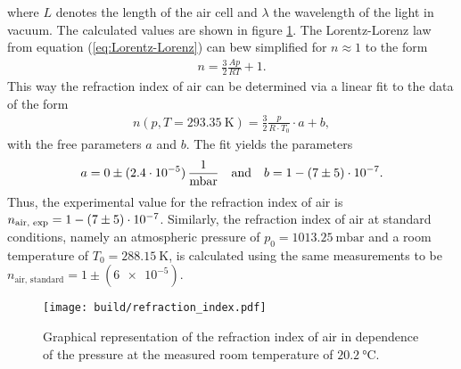 where $L$ denotes the length of the air cell and $\lambda$ the wavelength of the light in vacuum.
The calculated values are shown in figure \ref{fig:refraction_index}.
The Lorentz-Lorenz law from equation (\ref{eq:Lorentz-Lorenz}) can bew simplified for $n\approx1$ to the form
\begin{align}
    n = \frac 32 \frac{Ap}{RT}+1.
\end{align}
This way the refraction index of air can be determined via a linear fit to the data of the form
\begin{align}
    n(p, T=\SI{293.35}{\kelvin}) = \frac 32 \frac{p}{R\cdot T_0}\cdot a + b,
\end{align}
with the free parameters $a$ and $b$.
The fit yields the parameters
\begin{align*}
    a = 0\pm (2.4\cdot 10^{-5})\, \frac1{\text{mbar}} \quad \text{and} \quad b = 1 - \num{7\pm5e-7}.
\end{align*}
Thus, the experimental value for the refraction index of air is $n_{\text{air, exp}}=1-\num{7\pm5e-7}$. \newline
Similarly, the refraction index of air at standard conditions, namely an atmospheric pressure of $p_0=\SI{1013.25}{\milli\bar}$ and a room temperature of $T_0=\SI{288.15}{\kelvin}$, is calculated using the same measurements to be $n_{\text{air, standard}}=1\pm(\num{6e-5})$.
\begin{figure}[H]
    \centering
    \texttt{[image: build/refraction\_index.pdf]}
    \caption{Graphical representation of the refraction index of air in dependence of the pressure at the measured room temperature of $\SI{20.2}{\celsius}$.}
    \label{fig:refraction_index}
\end{figure}